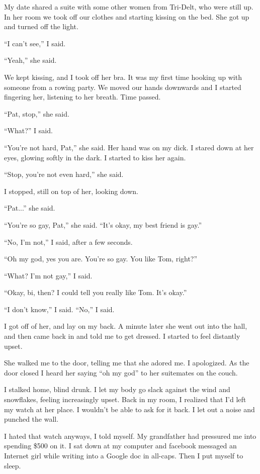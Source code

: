 My date shared a suite with some other women from Tri-Delt, who were still up.
In her room we took off our clothes and starting kissing on the bed.  She got up
and turned off the light.

``I can't see,'' I said.  

``Yeah,'' she said.

We kept kissing, and I took off her bra.  It was my first time hooking up with
someone from a rowing party.  We moved our hands downwards and I started
fingering her, listening to her breath.  Time passed.

``Pat, stop,'' she said.

``What?'' I said.

``You're not hard, Pat,'' she said.  Her hand was on my dick.  I stared down at
her eyes, glowing softly in the dark.  I started to kiss her again.

``Stop, you're not even hard,'' she said.

I stopped, still on top of her, looking down.

``Pat...'' she said.

``You're so gay, Pat,'' she said.  ``It's okay, my best friend is gay.''

``No, I'm not,'' I said, after a few seconds.

``Oh my god, yes you are.  You're so gay.  You like Tom, right?''

``What?  I'm not gay,'' I said.

``Okay, bi, then?  I could tell you really like Tom.  It's okay.''

``I don't know,'' I said.  ``No,'' I said.

I got off of her, and lay on my back.  A minute later she went out into the
hall, and then came back in and told me to get dressed.  I started to feel
distantly upset.

She walked me to the door, telling me that she adored me.  I apologized.  As the
door closed I heard her saying ``oh my god'' to her suitemates on the couch.

I stalked home, blind drunk.  I let my body go slack against the wind and
snowflakes, feeling increasingly upset.  Back in my room, I realized that I'd
left my watch at her place.  I wouldn't be able to ask for it back.  I let out a
noise and punched the wall. 

I hated that watch anyways, I told myself.  My grandfather had pressured me into
spending \$500 on it.   I sat down at my computer and facebook messaged an
Internet girl while writing into a Google doc in all-caps.  Then I put myself to
sleep.

